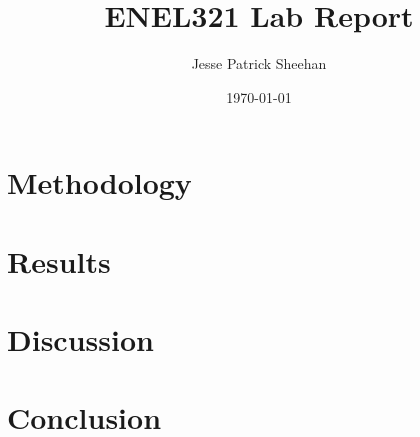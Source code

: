 \documentclass[12pt]{article} %
\title{ENEL321 Lab Report}
\date{\today}
\author{Jesse Patrick Sheehan}
\begin{document}
\maketitle

\vfill

\renewcommand{\abstractname}{Executive Summary}

\begin{abstract}


\blindtext

\end{abstract}

\newpage

\section{Methodology}


\blindtext

\blindtext

\blindtext

\newpage

\section{Results}


\blindtext

\blindtext

\blindtext

\newpage

\section{Discussion}


\blindtext

\blindtext

\blindtext

\newpage

\section{Conclusion}


\blindtext

\blindtext

\blindtext
\end{document}
